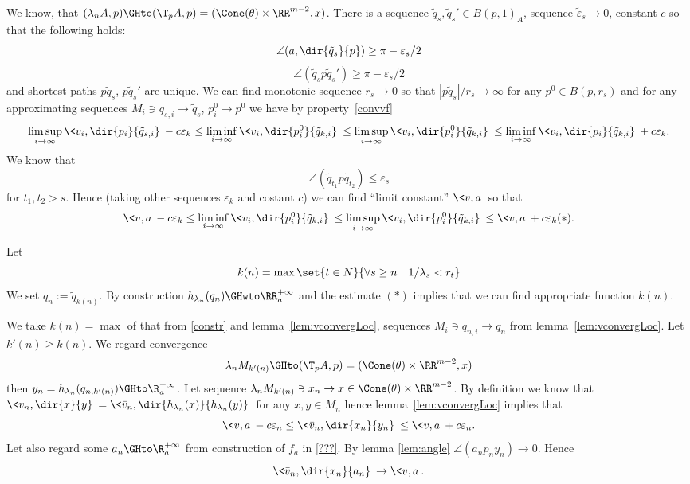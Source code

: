 We know, that $(\lambda_n A, p)\GHto (\T_p A, p)=( \Cone(\theta)\times \RR^{m-2},x)$.
There is a sequence $\tilde q_s, \tilde q_s' \in B(p,1)_A$,
 sequence $\tilde \varepsilon_s\to 0$, constant $c$ so that the following holds:
$$\angle(a,\dir{\tilde q_s}{p})\ge\pi- \varepsilon_s/2$$
 $$\angle(\tilde q_s p\tilde q_s')\ge\pi- \varepsilon_s/2$$
and shortest paths $p\tilde q_s$, $p\tilde q_s'$ are unique.
We can find monotonic sequence $r_s\to 0$ so that $|p\tilde q_s|/r_s\to\infty$
for any $p^0\in B(p,r_s)$
and for any approximating sequences
$M_i\ni q_{s,i}\to \tilde q_s$, $p^0_i\to p^0$ we have by property~\ref{convvf}
$$\limsup_{i\to\infty}  \< v_i,\dir{p_i}{\tilde q_{s,i}}\> -c\varepsilon_k\le
\liminf_{i\to\infty}  \<v_i,\dir{p^0_i}{\tilde q_{k,i}}\>\le\limsup_{i\to\infty}  \< v_i,\dir{p^0_i}{\tilde q_{k,i}}\>
\le\liminf_{i\to\infty}  \<v_i,\dir{p_i}{\tilde q_{k,i}}\> +c\varepsilon_k .
$$
We know that $$\angle(\tilde q_{t_1}p\tilde q_{t_2})\le\varepsilon_s$$ for $t_1, t_2>s$.
Hence (taking other sequences $\varepsilon_k$ and costant $c$)
we can find ``limit constant'' $\<v,a\>$ so that
 $$\<v,a\>-c\varepsilon_k\le
\liminf_{i\to\infty}
\<v_i,\dir{p^0_i}{\tilde q_{k,i}}\>\le\limsup_{i\to\infty}  \< v_i,\dir{p^0_i}{\tilde q_{k,i}}\>
\le\<v,a\> +c\varepsilon_k(*).$$

Let
$$k(n)=\max\set{t\in N}{\forall s\ge n\quad 1/\lambda_s<r_t}$$
We set $q_n:=\tilde q_{k(n)}$.
By construction $h_{\lambda_n}( q_n)\GHwto\RR_a^{+\infty}$
and the estimate $(*)$ implies that we can find appropriate function $k(n)$.
\qeds


We take $k(n)=\max$ of that from \ref{constr}
and lemma~\ref{lem:vconvergLoc},
sequences
$M_i\ni q_{n,i}\to q_n$ from  lemma~\ref{lem:vconvergLoc}.
Let $k'(n)\ge k(n)$.
We regard convergence
$$\lambda_n M_{k'(n)}\GHto (\T_p A, p)=( \Cone(\theta)\times \RR^{m-2},x)$$
then $y_n=h_{\lambda_n}(q_{n, k'(n)})\GHto \R_a^{+\infty} $.
Let sequence $\lambda_n M_{k'(n)}\ni x_n\to x\in  \Cone(\theta)\times \RR^{m-2}$.
By definition we know that
 $\<v_n,\dir{x}{y}\>=\<\bar v_n, \dir{h_{\lambda_n}(x)}{h_{\lambda_n}(y )}\>$
for any $x,y\in M_n$
hence lemma~\ref{lem:vconvergLoc} implies that
$$\<v,a\>-c\varepsilon_n\le\<\bar v_n,\dir{x_n}{y_n}\>\le\<v,a\>+c\varepsilon_n.$$
Let also regard some
$a_n\GHto \R_a^{+\infty} $ from construction of $f_a$ in \ref{???}.
By lemma \ref{lem:angle}
$\angle (a_n p_n y_n)\to 0$.
Hence
$$\<\bar v_n,\dir{x_n}{a_n}\>\to\<v,a\>.$$
\qeds

